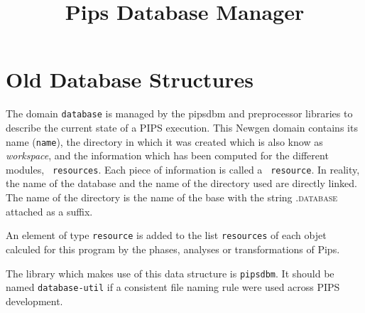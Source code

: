 \documentclass[a4paper]{article}
\title{Pips Database Manager}
\begin{document}
\maketitle
 
\section{Old Database Structures}
 
{ The domain {\tt database} is managed by the pipsdbm and preprocessor libraries
  to describe the current state of a PIPS execution. This Newgen domain contains its
  name ({\tt name}), the directory in which it was created which is
  also know as {\em workspace}, and the
  information which has been computed for the different modules, {\tt
    resources}. Each
  piece of information is called a {\tt
    resource}. In reality, the name of the database and the name of the
  directory used are directly linked. The name of the
  directory is the name of the base with the string \textsc{.database}
  attached as a suffix.
 
An element of type {\tt resource} is added to the list {\tt resources}
of each objet calculed for this program by the phases, analyses or
transformations of Pips.
 
The library which makes use of this data structure is
\texttt{pipsdbm}. It should be named \texttt{database-util} if a
consistent file naming rule were used across PIPS development.
 
}
 
\end{document}
